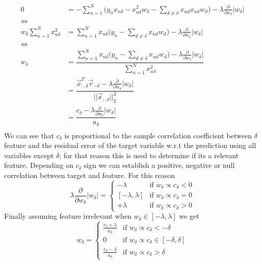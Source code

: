 \documentclass[../main.tex]{subfiles}
\begin{document}
\begin{align*}
    0
    &= -\sum_{n=1}^N \Big(y_n x_{n\delta} - x_{n\delta}^2 w_\delta - \sum_{d\neq\delta} x_{nd}x_{n\delta}w_d\Big) - \lambda \frac{\partial}{\partial w_\delta}|w_\delta|\\
    \Longleftrightarrow&\\
    w_\delta\sum_{n=1}^N x_{n\delta}^2
    &= \sum_{n=1}^N x_{n\delta}\Big( y_n - \sum_{d\neq\delta} x_{nd}w_d\Big) - \lambda \frac{\partial}{\partial w_\delta}|w_\delta|\\
    \Longleftrightarrow&\\
    w_\delta
    &= \dfrac{\sum_{n=1}^N x_{n\delta}\Big( y_n - \sum_{d\neq\delta} x_{nd}w_d\Big) - \lambda \frac{\partial}{\partial w_\delta}|w_\delta|}{\sum_{n=1}^N x_{n\delta}^2}\\
    &= \dfrac{\vec{x}_{:,\delta}^T  \vec{r}_{-\delta} - \lambda \frac{\partial}{\partial w_\delta}|w_\delta|}{||\vec{x}_{:,\delta}||_2^2}\\
    &= \dfrac{c_\delta - \lambda \frac{\partial}{\partial w_\delta}|w_\delta|}{a_\delta}\\  
\end{align*}
We can see that $c_\delta$ is proportional to the sample correlation coefficient between $\delta$ feature and the residual error of the target variable w.r.t the prediction using all variables except $\delta$; for that reason this is used to determine if its a relevant feature. Depending on $c_\delta$ sign we can establish a positive, negative or null correlation between target and feature.
For this reason
\begin{equation*}
    \lambda \frac{\partial}{\partial w_\delta}|w_\delta| = 
    \begin{cases}
        -\lambda & \text{if } w_\delta \propto c_\delta < 0 \\
        [-\lambda, \lambda] & \text{if } w_\delta \propto c_\delta = 0 \\
        +\lambda & \text{if } w_\delta \propto c_\delta >0
    \end{cases}
\end{equation*}
Finally assuming feature irrelevant when $w_\delta\in[-\lambda,\lambda]$ we get
\begin{equation*}
    w_\delta=
    \begin{cases}
        \frac{c_\delta + \lambda}{a_\delta} & \text{if } w_\delta \propto c_\delta < -\delta \\
        0 & \text{if } w_\delta \propto c_\delta \in [-\delta,\delta] \\
        \frac{c_\delta - \lambda}{a_\delta} & \text{if } w_\delta \propto c_\delta > \delta
    \end{cases}
\end{equation*}
\end{document}

